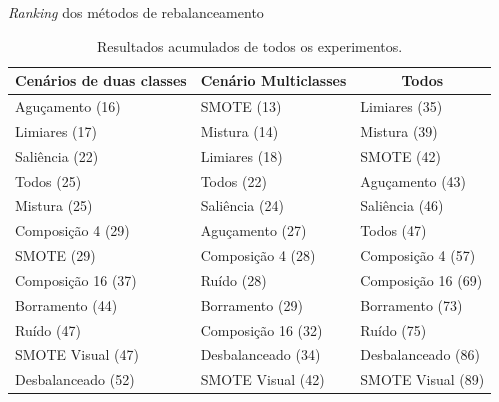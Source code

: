 \documentclass{beamer}
\begin{document}
\begin{frame}{\textit{Ranking} dos métodos de rebalanceamento}
\setlength\leftmargini{1em}
  \begin{table}
  \centering
  \caption{Resultados acumulados de todos os experimentos.}
  \footnotesize{
  \begin{tabular}{|l|l|l|}
  \hline
  \multicolumn{1}{|c|}{\textbf{Cenários de duas classes}} & \multicolumn{1}{c|}{\textbf{Cenário Multiclasses}} & \multicolumn{1}{c|}{\textbf{Todos}} \\ \hline
  Aguçamento (16)                                         & SMOTE (13)                                         & Limiares (35)                       \\ \hline
  Limiares (17)                                           & Mistura (14)                                       & Mistura (39)                        \\ \hline
  Saliência (22)                                          & Limiares (18)                                      & SMOTE (42)                          \\ \hline
  Todos (25)                                              & Todos (22)                                         & Aguçamento (43)                     \\ \hline
  Mistura (25)                                            & Saliência (24)                                     & Saliência (46)                      \\ \hline
  Composição 4 (29)                                       & Aguçamento (27)                                    & Todos (47)                          \\ \hline
  SMOTE (29)                                              & Composição 4 (28)                                  & Composição 4 (57)                   \\ \hline
  Composição 16 (37)                                      & Ruído (28)                                         & Composição 16 (69)                  \\ \hline
  Borramento (44)                                         & Borramento (29)                                    & Borramento (73)                     \\ \hline
  Ruído (47)                                              & Composição 16 (32)                                 & Ruído (75)                          \\ \hline
  SMOTE Visual (47)                                       & Desbalanceado (34)                                 & Desbalanceado (86)                  \\ \hline
  Desbalanceado (52)                                      & SMOTE Visual (42)                                  & SMOTE Visual (89)                   \\ \hline
  \end{tabular}
  }
  \end{table}
\end{frame}
\end{document}
